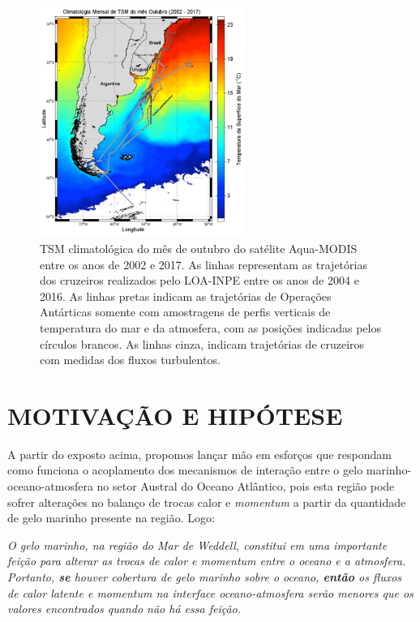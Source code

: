 \documentclass{article}
\begin{document}
\begin{figure}[H]
    \centering
    \includegraphics[width=0.60\textwidth]{img/loa_cruises.png}
	\caption{TSM climatológica do mês de outubro do satélite Aqua-MODIS entre os anos de 2002 e 2017.
	As linhas representam as trajetórias dos cruzeiros realizados
	pelo LOA-INPE entre os anos de 2004 e 2016. As linhas pretas indicam as trajetórias de
	Operações Antárticas somente com amostragens de perfis verticais de temperatura do mar e
	da atmosfera, com as posições indicadas pelos círculos brancos. As linhas cinza, indicam trajetórias de cruzeiros com
	medidas dos fluxos turbulentos.}
	\label{figloa}
\end{figure}

\section{MOTIVAÇÃO E HIPÓTESE}
\bigskip
A partir do exposto acima, propomos lançar mão em esforços que respondam como funciona o 
acoplamento dos mecanismos de interação entre o gelo marinho-oceano-atmosfera no setor Austral do Oceano Atlântico, pois 
esta região pode sofrer alterações no balanço de trocas calor e \textit{momentum} a partir da quantidade de gelo marinho presente 
na região. Logo:
\bigskip

\textit{O gelo marinho, na região do Mar de Weddell, constitui em uma importante feição para alterar as trocas de calor e momentum entre 
o oceano e a atmosfera. Portanto, \textbf{se} houver cobertura de gelo marinho sobre o oceano, \textbf{então} os fluxos de calor latente 
e momentum na interface oceano-atmosfera serão menores que os valores encontrados quando não há essa feição. }
\end{document}
